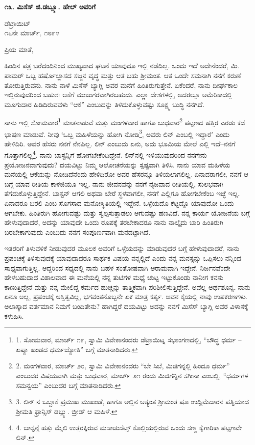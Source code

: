 \begin{center}
\textbf{೧೩. ಮಿಸೆಸ್ ಜಿ.ಡಬ್ಲ್ಯೂ. ಹೇಲ್ ಅವರಿಗೆ}
\end{center}

\begin{flushright}
ಡೆಟ್ರಾಯಿಟ್\\೧೬ನೇ ಮಾರ್ಚ್, ೧೮೯೪
\end{flushright}

ಪ್ರಿಯ ಮಾತೆ,

ಹಿಂದಿನ ಪತ್ರ ಬರೆದಂದಿನಿಂದ ಮುಖ್ಯವಾದ ಘಟನೆ ಯಾವುದೂ ಇಲ್ಲಿ ನಡೆದಿಲ್ಲ. ಒಂದು ಇದೆ ಅದೇನೆಂದರೆ, ಮಿ. ಪಾಮರ್ ಒಬ್ಬ ಹರ್ಷೊಲ್ಲಾಸದ ಸಜ್ಜನ ವೃದ್ಧ ಮತ್ತು ಆತ ಬಹು ಶ‍್ರೀಮಂತ. ಆತ ಒಂದೇ ಸಮನಾಗಿ ನನಗೆ ಕರುಣೆ ತೋರುತ್ತಿರುವನು. ನಾನು ನಾಳೆ ಮಿಸೆಸ್ ಬ್ಯಾಗ್ಲಿ ಅವರ ಮನೆಗೆ ಹಿಂತಿರುಗುತ್ತೇನೆ. ಏಕೆಂದರೆ, ನಾನು ದೀರ್ಘಕಾಲ ಇಲ್ಲಿರುವುದರಿಂದ ಬಹುಶಃ ಆಕೆಗೆ ಮುಜುಗರವಾಗಿರಬಹುದು. ಎಲ್ಲಾ ದೇಶಗಳಲ್ಲಿ, ಅದರಲ್ಲೂ ಅಮೆರಿಕಾದಲ್ಲಿ ಮೂಗುದಾರ ಹಿಡಿದಿರುವವಳು “ಆಕೆ” ಎಂಬುದನ್ನು ತಿಳಿದುಕೊಳ್ಳುವಷ್ಟು ಸೂಕ್ಷ್ಮ ಬುದ್ಧಿ ನನಗಿದೆ.

ನಾನು ಇಲ್ಲಿ ಸೋಮವಾರ\footnote{1. ಸೋಮವಾರ, ಮಾರ್ಚ್ ೧೯, ಸ್ವಾಮಿ ವಿವೇಕಾನಂದರು ಡೆಟ್ರಾಯಿಟ್ನ ಸಭಾಂಗಣದಲ್ಲಿ, “ಬೌದ್ಧ ಧರ್ಮ –ಏಷ್ಯಾ ಖಂಡದ ಧರ್ಮಜ್ಯೋತಿ” ಬಗ್ಗೆ ಮಾತನಾಡಿದರು.} ಮಾತನಾಡುವೆ ಮತ್ತು ಮಂಗಳವಾರ ಹಾಗೂ ಬುಧವಾರ\footnote{2. ಮಂಗಳವಾರ, ಮಾರ್ಚ್ ೨೦, ಸ್ವಾಮಿ ವಿವೇಕಾನಂದರು “ಬೇ ಸಿಬೆ, ಮಿಚಿಗನ್ನಲ್ಲಿ ಹಿಂದೂ ಧರ್ಮ” ಎಂಬುದರ ವಿಷಯವಾಗಿ ಮತ್ತು ಬುಧವಾರ, ಮಾರ್ಚ್ ೨೧ ರಂದು ಮಿಚಿಗನ್ನಿನ ಸಗೀನಾ ಎಂಬಲ್ಲಿ, “ಧರ್ಮಗಳ ಸಮನ್ವಯ” ಎಂಬುದರ ಬಗ್ಗೆ ಮಾತನಾಡಿದರು.} ಪಟ್ಟಣದ ಹತ್ತಿರ ಎರಡು ಕಡೆ ಭಾಷಣ ಮಾಡುವೆ. ನೀವು ‘ಒಬ್ಬ ಮಹಿಳೆಯನ್ನು ಹೋಗಿ ನೋಡಿ\footnote{3. ಲಿನ್ ನ ಒಬ್ಬಾಕೆ ಪ್ರಮುಖ ಮುಖಂಡೆ, ಹಾಗೂ ಅಲ್ಲಿನ ಅತ್ಯಂತ ಶ‍್ರೀಮಂತ ಷೂ ಉದ್ದಿಮೆದಾರನ ಪತ್ನಿಯಾದ ಶ‍್ರೀಮತಿ ಫ್ರಾನ್ಸಿಸ್ ಡಬ್ಲ್ಯು. ಬ್ರೀಡ್ ಆ ಮಹಿಳೆ.}, ಅವರು ಲಿನ್ ಎಂಬಲ್ಲಿ ಇದ್ದಾರೆ’ ಎಂದು ಹೇಳಿದಿರಿ. ಅವರ ಹೆಸರು ನನಗೆ ನೆನಪಿಲ್ಲ. ಲಿನ್ ಎಂಬುದು ಏನು, ಅದು ಭೂಮಿಯ ಮೇಲೆ ಎಲ್ಲಿ ಇದೆ–ನನಗೆ ಗೊತ್ತಾಗಲಿಲ್ಲ\footnote{4. ಬಾಸ್ಟನ್ಗೆ ಹತ್ತು ಮೈಲಿ ಉತ್ತರಕ್ಕಿರುವ ಮಸಾಚುಸೆಟ್ಸ್ ಕೊಲ್ಲಿಯಲ್ಲಿರುವ ಒಂದು ಸಣ್ಣ ಕೈಗಾರಿಕಾ ಪಟ್ಟಣವೇ ಲಿನ್.}. ನಾನು ಬಾಸ್ಟನ್ನಿಗೆ ಹೋಗಬೇಕೆಂದಿದ್ದೇನೆ. ಲಿನ್‌ನಲ್ಲಿ ಇಳಿಯುವುದರಿಂದ ನನಗೇನು ಪ್ರಯೋಜನವಾಗುವುದು? ದಯವಿಟ್ಟು ನಿಮ್ಮ ಆಲೋಚನೆಯನ್ನು ಸ್ಪಷ್ಟವಾಗಿ ತಿಳಿಸಿ. ನಾನು ಯಾವ ಮಹಿಳೆಯ ಮನೆಯಲ್ಲಿ ಆಕೆಯನ್ನು ನೋಡಿದೆನೆಂದು ಹೇಳಿದಿರೋ ಅವರ ಹೆಸರನ್ನೂ ತಿಳಿಯಲಾಗಲಿಲ್ಲ. ಏನಾದರಾಗಲೀ, ನನಗೆ ಆ ಬಗ್ಗೆ ಯಾವ ರೀತಿಯ ಕಾಳಜಿಯೂ ಇಲ್ಲ. ನಾನು ಜೀವನವನ್ನು ನನಗೆ ನೈಜವಾದ ರೀತಿಯಲ್ಲಿ, ಸುಲಭವಾಗಿ ತೆಗೆದುಕೊಳ್ಳುತ್ತಿದ್ದೇನೆ. ಬಾಸ್ಟನ್ ಆಗಲಿ ಅಥವಾ ಬೇರೆ ಸ್ಥಳವಾಗಲೀ, ನನಗೆ ಎಲ್ಲಿಗೂ ಹೋಗಬೇಕೆಂಬ ಇಚ್ಛೆ ಇಲ್ಲ. ಏನಾದರೂ ಬರಲಿ ಎಂಬ ಸೊಗಸಾದ ಮನೋಸ್ಥಿತಿಯಲ್ಲಿ ಇದ್ದೇನೆ. ಒಳ್ಳೆಯದೊ ಕೆಟ್ಟದ್ದೊ ಯಾವುದೋ ಒಂದು ಆಗಬೇಕು. ಹಿಂತಿರುಗಿ ಹೋಗುವಷ್ಟು ಮತ್ತು ಸ್ವಲ್ಪಸುತ್ತಾಡಲು ಆಗುವಷ್ಟು ಹಣವಿದೆ. ನನ್ನ ಕಾರ್ಯ ಯೋಜನೆಯ ಬಗ್ಗೆ ಹೇಳುವುದಾದರೆ, ಅದನ್ನು ಯಾವುದೇ ಒಂದು ರೂಪಕ್ಕೆ ತರಬೇಕಾದರೂ ನಾನು ನಾಲ್ಕೈದು ಬಾರಿ ಹಿಂತಿರುಗಿ ಬರಬೇಕಾಗುವುದು ಎಂಬುದು ನನಗೆ ಸಂಪೂರ್ಣವಾಗಿ ಮನದಟ್ಟಾಗಿದೆ.

ಇತರರಿಗೆ ತಿಳುವಳಿಕೆ ನೀಡುವುದರ ಮೂಲಕ ಅವರಿಗೆ ಒಳ್ಳೆಯದನ್ನು ಮಾಡುವುದರ ಬಗ್ಗೆ ಹೇಳುವುದಾದರೆ, ನಾನು ಪ್ರಪಂಚಕ್ಕೆ ತಿಳಿಸುವುದಕ್ಕೆ ಯಾವುದಾದರೂ ಸಾರ್ಥಕ ವಿಷಯ ನನ್ನಲ್ಲಿದೆ ಎಂದು ನನ್ನ ಮನಸ್ಸನ್ನು ಒಪ್ಪಿಸಲು ನನ್ನಿಂದ ಸಾಧ್ಯವಾಗುತ್ತಿಲ್ಲ. ಆದ್ದರಿಂದ ಸಧ್ಯದಲ್ಲಿ ನಾನು ಬಹಳ ಸಂತೋಷವಾಗಿ ಆರಾಮವಾಗಿ ಇದ್ದೇನೆ. ನಿರ್ಜನವೆಂದೇ ಹೇಳಬಹುದಾದ ವಿಶಾಲವಾದ ಈ ಮನೆಯಲ್ಲಿ ನನ್ನ ತುಟಿಗಳ ಮಧ್ಯೆ ಚುಟ್ಟ ಇಟ್ಟುಕೊಂಡು ನಾನೀಗ ಕನಸು ಕಾಣುತ್ತಿದ್ದೇನೆ ಮತ್ತು ನನ್ನ ಮೇಲಿದ್ದ ಕರ್ಮದ ಹುಚ್ಚನ್ನು ತಾತ್ತ್ವಿಕವಾಗಿ ಪರಿಶೀಲಿಸುತ್ತಿದ್ದೇನೆ. ಅವೆಲ್ಲ ಅರ್ಥಶೂನ್ಯ. ನಾನು ಏನೂ ಅಲ್ಲ, ಪ್ರಪಂಚಕ್ಕೆ ಅಸ್ತಿತ್ವವಿಲ್ಲ, ಭಗವಂತನೊಬ್ಬನೇ ಏಕ ಮಾತ್ರ ಕರ್ತೃ. ಅವನ ಕೈಯಲ್ಲಿ ನಾವು ಉಪಕರಣಗಳು. ಅಲಾಸ್ಕಾದ ವರ್ತಮಾನ ನಿಮಗೆ ಬಂದಿತೇನು? ಹಾಗಿದ್ದರೆ ದಯವಿಟ್ಟು ಅದನ್ನು ನನಗೆ ಮಿಸೆಸ್ ಬ್ಯಾಗ್ಲಿ ಅವರ ವಿಳಾಸಕ್ಕೆ ಕಳುಹಿಸಿ.

